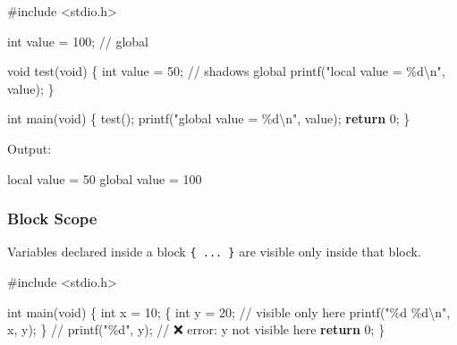 \documentclass[
  letterpaper,
  DIV=11,
  numbers=noendperiod]{scrreprt}
\newenvironment{Shaded}{\begin{snugshade}}{\end{snugshade}}
\newcommand{\BuiltInTok}[1]{\textcolor[rgb]{0.00,0.23,0.31}{#1}}
\newcommand{\CommentTok}[1]{\textcolor[rgb]{0.37,0.37,0.37}{#1}}
\newcommand{\ControlFlowTok}[1]{\textcolor[rgb]{0.00,0.23,0.31}{\textbf{#1}}}
\newcommand{\DataTypeTok}[1]{\textcolor[rgb]{0.68,0.00,0.00}{#1}}
\newcommand{\DecValTok}[1]{\textcolor[rgb]{0.68,0.00,0.00}{#1}}
\newcommand{\ExtensionTok}[1]{\textcolor[rgb]{0.00,0.23,0.31}{#1}}
\newcommand{\ImportTok}[1]{\textcolor[rgb]{0.00,0.46,0.62}{#1}}
\newcommand{\NormalTok}[1]{\textcolor[rgb]{0.00,0.23,0.31}{#1}}
\newcommand{\OperatorTok}[1]{\textcolor[rgb]{0.37,0.37,0.37}{#1}}
\newcommand{\PreprocessorTok}[1]{\textcolor[rgb]{0.68,0.00,0.00}{#1}}
\newcommand{\SpecialCharTok}[1]{\textcolor[rgb]{0.37,0.37,0.37}{#1}}
\newcommand{\StringTok}[1]{\textcolor[rgb]{0.13,0.47,0.30}{#1}}
\newcommand{\VariableTok}[1]{\textcolor[rgb]{0.07,0.07,0.07}{#1}}
\begin{document}
\begin{Shaded}
\begin{Highlighting}[]
\PreprocessorTok{\#include }\ImportTok{\textless{}stdio.h\textgreater{}}

\DataTypeTok{int}\NormalTok{ value }\OperatorTok{=} \DecValTok{100}\OperatorTok{;}   \CommentTok{// global}

\DataTypeTok{void}\NormalTok{ test}\OperatorTok{(}\DataTypeTok{void}\OperatorTok{)} \OperatorTok{\{}
    \DataTypeTok{int}\NormalTok{ value }\OperatorTok{=} \DecValTok{50}\OperatorTok{;}   \CommentTok{// shadows global}
\NormalTok{    printf}\OperatorTok{(}\StringTok{"local value = }\SpecialCharTok{\%d\textbackslash{}n}\StringTok{"}\OperatorTok{,}\NormalTok{ value}\OperatorTok{);}
\OperatorTok{\}}

\DataTypeTok{int}\NormalTok{ main}\OperatorTok{(}\DataTypeTok{void}\OperatorTok{)} \OperatorTok{\{}
\NormalTok{    test}\OperatorTok{();}
\NormalTok{    printf}\OperatorTok{(}\StringTok{"global value = }\SpecialCharTok{\%d\textbackslash{}n}\StringTok{"}\OperatorTok{,}\NormalTok{ value}\OperatorTok{);}
    \ControlFlowTok{return} \DecValTok{0}\OperatorTok{;}
\OperatorTok{\}}
\end{Highlighting}
\end{Shaded}

Output:

\begin{Shaded}
\begin{Highlighting}[]
\BuiltInTok{local} \VariableTok{value} \OperatorTok{=}\NormalTok{ 50}
\ExtensionTok{global}\NormalTok{ value = 100}
\end{Highlighting}
\end{Shaded}

\subsubsection{Block Scope}\label{block-scope}

Variables declared inside a block \texttt{\{\ ...\ \}} are visible only
inside that block.

\begin{Shaded}
\begin{Highlighting}[]
\PreprocessorTok{\#include }\ImportTok{\textless{}stdio.h\textgreater{}}

\DataTypeTok{int}\NormalTok{ main}\OperatorTok{(}\DataTypeTok{void}\OperatorTok{)} \OperatorTok{\{}
    \DataTypeTok{int}\NormalTok{ x }\OperatorTok{=} \DecValTok{10}\OperatorTok{;}
    \OperatorTok{\{}
        \DataTypeTok{int}\NormalTok{ y }\OperatorTok{=} \DecValTok{20}\OperatorTok{;}   \CommentTok{// visible only here}
\NormalTok{        printf}\OperatorTok{(}\StringTok{"}\SpecialCharTok{\%d}\StringTok{ }\SpecialCharTok{\%d\textbackslash{}n}\StringTok{"}\OperatorTok{,}\NormalTok{ x}\OperatorTok{,}\NormalTok{ y}\OperatorTok{);}
    \OperatorTok{\}}
    \CommentTok{// printf("\%d", y);  // ❌ error: y not visible here}
    \ControlFlowTok{return} \DecValTok{0}\OperatorTok{;}
\OperatorTok{\}}
\end{Highlighting}
\end{Shaded}
\end{document}
